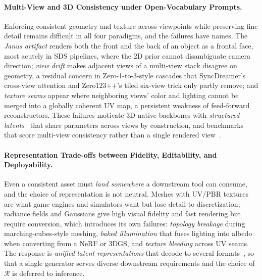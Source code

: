 \paragraph{Multi-View and 3D Consistency under Open-Vocabulary Prompts.}
Enforcing consistent geometry and texture across viewpoints while preserving fine detail remains difficult in all four paradigms, and the failures have names.
The \emph{Janus artifact} renders both the front and the back of an object as a frontal face, most acutely in SDS pipelines, where the 2D prior cannot disambiguate camera direction; \emph{view drift} makes adjacent views of a multi-view stack disagree on geometry, a residual concern in Zero-1-to-3-style cascades that SyncDreamer's cross-view attention and Zero123++'s tiled six-view trick only partly remove; and \emph{texture seams} appear where neighboring views' color and lighting cannot be merged into a globally coherent UV map, a persistent weakness of feed-forward reconstructors.
These failures motivate 3D-native backbones with \emph{structured latents}~\cite{xiang2025trellis} that share parameters across views by construction, and benchmarks that score multi-view consistency rather than a single rendered view~\cite{zhang2025mate3d}.

\paragraph{Representation Trade-offs between Fidelity, Editability, and Deployability.}
Even a consistent asset must \emph{land somewhere} a downstream tool can consume, and the choice of representation is not neutral.
Meshes with UV/PBR textures are what game engines and simulators want but lose detail to discretization; radiance fields and Gaussians give high visual fidelity and fast rendering but require conversion, which introduces its own failures: \emph{topology breakage} during marching-cubes-style meshing, \emph{baked illumination} that fuses lighting into albedo when converting from a NeRF or 3DGS, and \emph{texture bleeding} across UV seams.
The response is \emph{unified latent representations} that decode to several formats~\cite{xiang2025trellis}, so that a single generator serves diverse downstream requirements and the choice of $\mathcal{R}$ is deferred to inference.

